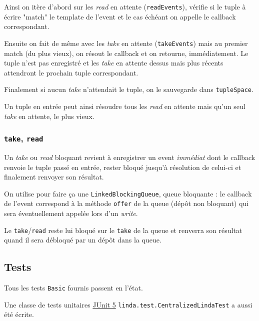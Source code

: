 \documentclass[headings=standardclasses,parskip=half]{scrartcl}
\begin{document}
Ainsi on itère d'abord sur les \emph{read} en attente (\texttt{readEvents}),
vérifie si le tuple à écrire "match" le template de l'event et le cas
échéant on appelle le callback correspondant.

Ensuite on fait de même avec les \emph{take} en attente (\texttt{takeEvents})
mais au premier match (du plus vieux), on résout le callback et on retourne,
immédiatement. Le tuple n'est pas enregistré et les \emph{take} en attente
dessus mais plus récents attendront le prochain tuple correspondant.

Finalement si aucun \emph{take} n'attendait le tuple, on le sauvegarde dans
\texttt{tupleSpace}.

Un tuple en entrée peut ainsi résoudre tous les \emph{read} en attente mais
qu'un seul \emph{take} en attente, le plus vieux.

\subsubsection{\texttt{take}, \texttt{read}}

Un \emph{take} ou \emph{read} bloquant revient à enregistrer un event
\emph{immédiat} dont le callback renvoie le tuple passé en entrée,
rester bloqué jusqu'à résolution de celui-ci et finalement renvoyer
son résultat.

On utilise pour faire ça une \texttt{LinkedBlockingQueue}, queue bloquante :
le callback de l'event correspond à la méthode \texttt{offer} de la queue
(dépôt non bloquant) qui sera éventuellement appelée lors d'un \emph{write}.

Le \texttt{take}/\texttt{read} reste lui bloqué sur le \texttt{take} de la
queue et renverra son résultat quand il sera débloqué par un dépôt dans
la queue.

\subsection{Tests}

Tous les tests \texttt{Basic} fournis passent en l'état.

Une classe de tests unitaires \href{https://junit.org/junit5/}{JUnit 5}
\texttt{linda.test.CentralizedLindaTest} a aussi été écrite.
\end{document}
